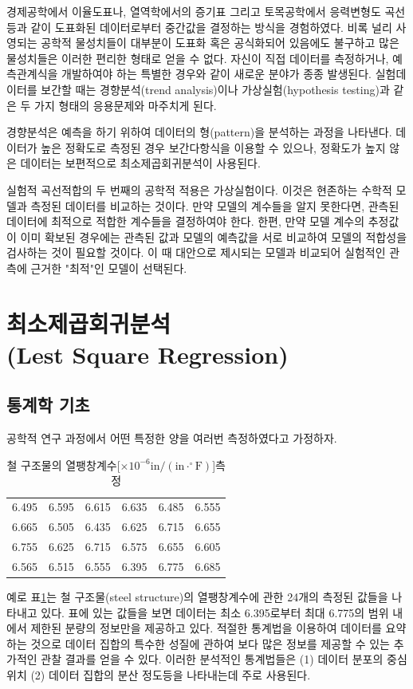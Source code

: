 경제공학에서 이율도표나, 열역학에서의 증기표 그리고 토목공학에서 응력변형도 곡선등과 같이 도표화된 데이터로부터 중간값을 결정하는 방식을 경험하였다. 비록 널리 사영되는 공학적 물성치들이 대부분이 도표화 혹은 공식화되어 있음에도 불구하고 많은 물성치들은 이러한 편리한 형태로 얻을 수 없다. 자신이 직접 데이터를 측정하거나, 예측관계식을 개발하여야 하는 특별한 경우와 같이 새로운 분야가 종종 발생된다. 실험데이터를 보간할 때는 경향분석(trend analysis)이나 가상실험(hypothesis testing)과 같은 두 가지 형태의 응용문제와 마주치게 된다.

경향분석은 예측을 하기 위하여 데이터의 형(pattern)을 분석하는 과정을 나타낸다. 데이터가 높은 정확도로 측정된 경우 보간다항식을 이용할 수 있으나, 정확도가 높지 않은 데이터는 보편적으로 최소제곱회귀분석이 사용된다.

실험적 곡선적합의 두 번째의 공학적 적용은 가상실험이다. 이것은 현존하는 수학적 모델과 측정된 데이터를 비교하는 것이다. 만약 모델의 계수들을 알지 못한다면, 관측된 데이터에 최적으로 적합한 계수들을 결정하여야 한다. 한편, 만약 모델 계수의 추정값이 이미 확보된 경우에는 관측된 값과 모델의 예측값을 서로 비교하여 모델의 적합성을 검사하는 것이 필요할 것이다. 이 때 대안으로 제시되는 모델과 비교되어 실험적인 관측에 근거한 "최적"인 모델이 선택된다.

\section{최소제곱회귀분석\\(Lest Square Regression)}
\subsection{통계학 기초}
공학적 연구 과정에서 어떤 특정한 양을 여러번 측정하였다고 가정하자. 

\begin{table}[!hbt]
\centering
\begin{tabular}{c|c|c|c|c|c}
\hline\hline
6.495&6.595&6.615&6.635&6.485&6.555\\
6.665&6.505&6.435&6.625&6.715&6.655\\
6.755&6.625&6.715&6.575&6.655&6.605\\
6.565&6.515&6.555&6.395&6.775&6.685\\
\hline\hline
\end{tabular}
\caption{철 구조물의 열팽창계수[$\times 10^{-6}\text{in}/(\text{in}\cdot^{\circ}\text{F})$]측정}
\label{tab:pt5-1}
\end{table}

예로 표\ref{tab:pt5-1}는 철 구조물(steel structure)의 열팽창계수에 관한 24개의 측정된 값들을 나타내고 있다. 표에 있는 값들을 보면 데이터는 최소 6.395로부터 최대 6.775의 범위 내에서 제한된 분량의 정보만을 제공하고 있다. 적절한 통계법을 이용하여 데이터를 요약하는 것으로 데이터 집합의 특수한 성질에 관하여 보다 많은 정보를 제공할 수 있는 추가적인 관찰 결과를 얻을 수 있다. 이러한 분석적인 통계법들은 (1) 데이터 분포의 중심위치 (2) 데이터 집합의 분산 정도등을 나타내는데 주로 사용된다.

